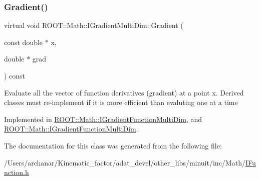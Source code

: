 \subsubsection{\texorpdfstring{Gradient()}{Gradient()}\hspace{0.1cm}{\footnotesize\ttfamily [2/2]}}
{\footnotesize\ttfamily virtual void R\+O\+O\+T\+::\+Math\+::\+I\+Gradient\+Multi\+Dim\+::\+Gradient (\begin{DoxyParamCaption}\item[{const double $\ast$}]{x,  }\item[{double $\ast$}]{grad }\end{DoxyParamCaption}) const\hspace{0.3cm}{\ttfamily [pure virtual]}}

Evaluate all the vector of function derivatives (gradient) at a point x. Derived classes must re-\/implement if it is more efficient than evaluting one at a time 

Implemented in \mbox{\hyperlink{classROOT_1_1Math_1_1IGradientFunctionMultiDim_ab65a713d2637c69b334d2119ef4f0e26}{R\+O\+O\+T\+::\+Math\+::\+I\+Gradient\+Function\+Multi\+Dim}}, and \mbox{\hyperlink{classROOT_1_1Math_1_1IGradientFunctionMultiDim_ab65a713d2637c69b334d2119ef4f0e26}{R\+O\+O\+T\+::\+Math\+::\+I\+Gradient\+Function\+Multi\+Dim}}.



The documentation for this class was generated from the following file\+:\begin{DoxyCompactItemize}
\item 
/\+Users/archanar/\+Kinematic\+\_\+factor/adat\+\_\+devel/other\+\_\+libs/minuit/inc/\+Math/\mbox{\hyperlink{other__libs_2minuit_2inc_2Math_2IFunction_8h}{I\+Function.\+h}}\end{DoxyCompactItemize}
